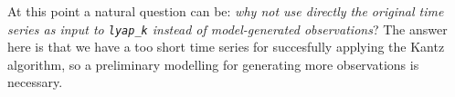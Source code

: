 \documentclass[a4paper]{article}
\begin{document}
At this point a natural question can be: 
\emph{why not use directly the original time series as input to \texttt{lyap\_k} instead of model-generated observations}?
The answer here is that we have a too short time series for succesfully applying the Kantz algorithm, 
so a preliminary modelling for generating more observations is necessary.
\nocite{*}



\end{document}
